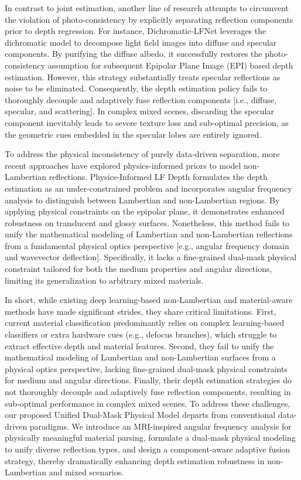In contrast to joint estimation, another line of research attempts to circumvent the violation of photo-consistency by explicitly separating reflection components prior to depth regression. For instance, Dichromatic-LFNet \cite{DichromaticLFNetdichromatic} leverages the dichromatic model to decompose light field images into diffuse and specular components. By purifying the diffuse albedo, it successfully restores the photo-consistency assumption for subsequent Epipolar Plane Image (EPI) based depth estimation. However, this strategy substantially treats specular reflections as noise to be eliminated. Consequently, the depth estimation policy fails to thoroughly decouple and adaptively fuse reflection components  [i.e., diffuse, specular, and scattering]. In complex mixed scenes, discarding the specular component inevitably leads to severe texture loss and sub-optimal precision, as the geometric cues embedded in the specular lobes are entirely ignored.

To address the physical inconsistency of purely data-driven separation, more recent approaches have explored physics-informed priors to model non-Lambertian reflections. Physics-Informed LF Depth \cite{PhysicsInformedLFDepthphys} formulates the depth estimation as an under-constrained problem and incorporates angular frequency analysis to distinguish between Lambertian and non-Lambertian regions. By applying physical constraints on the epipolar plane, it demonstrates enhanced robustness on translucent and glossy surfaces. Nonetheless, this method fails to unify the mathematical modeling of Lambertian and non-Lambertian reflections from a fundamental physical optics perspective  [e.g., angular frequency domain and wavevector deflection]. Specifically, it lacks a fine-grained dual-mask physical constraint tailored for both the medium properties and angular directions, limiting its generalization to arbitrary mixed materials.

In short, while existing deep learning-based non-Lambertian and material-aware methods have made significant strides, they share critical limitations. First, current material classification predominantly relies on complex learning-based classifiers or extra hardware cues (e.g., defocus branches), which struggle to extract effective depth and material features. Second, they fail to unify the mathematical modeling of Lambertian and non-Lambertian surfaces from a physical optics perspective, lacking fine-grained dual-mask physical constraints for medium and angular directions. Finally, their depth estimation strategies do not thoroughly decouple and adaptively fuse reflection components, resulting in sub-optimal performance in complex mixed scenes. To address these challenges, our proposed Unified Dual-Mask Physical Model departs from conventional data-driven paradigms. We introduce an MRI-inspired angular frequency analysis for physically meaningful material parsing, formulate a dual-mask physical modeling to unify diverse reflection types, and design a component-aware adaptive fusion strategy, thereby dramatically enhancing depth estimation robustness in non-Lambertian and mixed scenarios.

